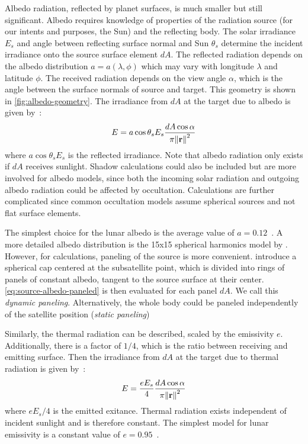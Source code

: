 \documentclass[parskip=full,DIV=15]{scrartcl}
\begin{document}
Albedo radiation, reflected by planet surfaces, is much smaller but still significant. Albedo requires knowledge of properties of the radiation source (for our intents and purposes, the Sun) and the reflecting body. The solar irradiance $E_s$ and angle between reflecting surface normal and Sun $\theta_s$ determine the incident irradiance onto the source surface element $dA$. The reflected radiation depends on the albedo distribution $a=a(\lambda, \phi)$ which may vary with longitude $\lambda$ and latitude $\phi$. The received radiation depends on the view angle $\alpha$, which is the angle between the surface normals of source and target. This geometry is shown in \cref{fig:albedo-geometry}. The irradiance from $dA$ at the target due to albedo is given by~\cite{Knocke1988}:
\begin{align}\label{eq:source-albedo-paneled}
   E = a\cos\theta_s E_s\frac{dA\cos\alpha}{\pi \norm{\vb r}^2}
\end{align}
where $a\cos\theta_s E_s$ is the reflected irradiance. Note that albedo radiation only exists if $dA$ receives sunlight. Shadow calculations could also be included but are more involved for albedo models, since both the incoming solar radiation and outgoing albedo radiation could be affected by occultation. Calculations are further complicated since common occultation models assume spherical sources and not flat surface elements.

The simplest choice for the lunar albedo is the average value of $a=0.12$~\cite{Mueller2021}. A more detailed albedo distribution is the 15x15 spherical harmonics model by \textcite{Floberghagen1999}. However, for calculations, paneling of the source is more convenient. \textcite{Knocke1988} introduce a spherical cap centered at the subsatellite point, which is divided into rings of panels of constant albedo, tangent to the source surface at their center. \cref{eq:source-albedo-paneled} is then evaluated for each panel $dA$. We call this \emph{dynamic paneling}. Alternatively, the whole body could be paneled independently of the satellite position (\emph{static paneling})

Similarly, the thermal radiation can be described, scaled by the emissivity $e$. Additionally, there is a factor of $1/4$, which is the ratio between receiving and emitting surface. Then the irradiance from $dA$ at the target due to thermal radiation is given by~\cite{Knocke1988}:
\begin{align}\label{eq:source-thermal-knocke}
   E = \frac{e E_s}{4} \frac{dA\cos\alpha}{\pi \norm{\vb r}^2}
\end{align}
where $e E_s/4$ is the emitted exitance. Thermal radiation exists independent of incident sunlight and is therefore constant. The simplest model for lunar emissivity is a constant value of $e=0.95$~\cite{Mueller2021}.
\end{document}
